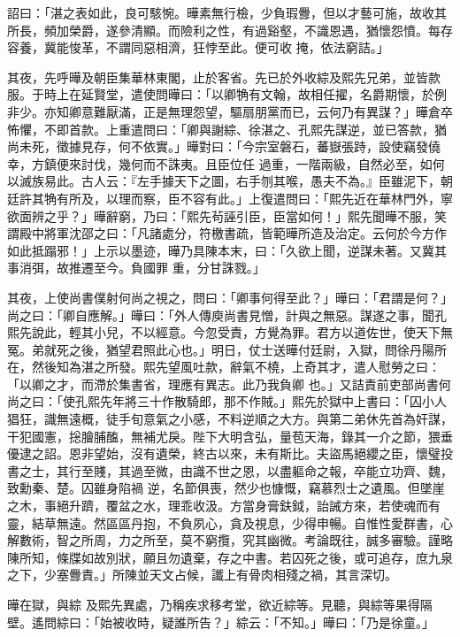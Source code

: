 \begin{pinyinscope}
 詔曰：「湛之表如此，良可駭惋。曄素無行檢，少負瑕釁，但以才藝可施，故收其所長，頻加榮爵，遂參清顯。而險利之性，有過谿壑，不識恩遇，猶懷怨憤。每存容養，冀能悛革，不謂同惡相濟，狂悖至此。便可收
 掩，依法窮詰。」



 其夜，先呼曄及朝臣集華林東閣，止於客省。先已於外收綜及熙先兄弟，並皆款服。于時上在延賢堂，遣使問曄曰：「以卿觕有文翰，故相任擢，名爵期懷，於例非少。亦知卿意難厭滿，正是無理怨望，驅扇朋黨而已，云何乃有異謀？」曄倉卒怖懼，不即首款。上重遣問曰：「卿與謝綜、徐湛之、孔熙先謀逆，並已答款，猶尚未死，徵據見存，何不依實。」曄對曰：「今宗室磐石，蕃嶽張跱，設使竊發僥幸，方鎮便來討伐，幾何而不誅夷。且臣位任
 過重，一階兩級，自然必至，如何以滅族易此。古人云：『左手據天下之圖，右手刎其喉，愚夫不為。』臣雖泥下，朝廷許其觕有所及，以理而察，臣不容有此。」上復遣問曰：「熙先近在華林門外，寧欲面辨之乎？」曄辭窮，乃曰：「熙先茍誣引臣，臣當如何！」熙先聞曄不服，笑謂殿中將軍沈邵之曰：「凡諸處分，符檄書疏，皆範曄所造及治定。云何於今方作如此抵蹋邪！」上示以墨迹，曄乃具陳本末，曰：「久欲上聞，逆謀未著。又冀其事消弭，故推遷至今。負國罪
 重，分甘誅戮。」



 其夜，上使尚書僕射何尚之視之，問曰：「卿事何得至此？」曄曰：「君謂是何？」尚之曰：「卿自應解。」曄曰：「外人傳庾尚書見憎，計與之無惡。謀遂之事，聞孔熙先說此，輕其小兒，不以經意。今忽受責，方覺為罪。君方以道佐世，使天下無冤。弟就死之後，猶望君照此心也。」明日，仗士送曄付廷尉，入獄，問徐丹陽所在，然後知為湛之所發。熙先望風吐款，辭氣不橈，上奇其才，遣人慰勞之曰：「以卿之才，而滯於集書省，理應有異志。此乃我負卿
 也。」又詰責前吏部尚書何尚之曰：「使孔熙先年將三十作散騎郎，那不作賊。」熙先於獄中上書曰：「囚小人猖狂，識無遠概，徒手旬意氣之小感，不料逆順之大方。與第二弟休先首為奸謀，干犯國憲，捴膾脯醢，無補尤戾。陛下大明含弘，量苞天海，錄其一介之節，猥垂優逮之詔。恩非望始，沒有遺榮，終古以來，未有斯比。夫盜馬絕纓之臣，懷璧投書之士，其行至賤，其過至微，由識不世之恩，以盡軀命之報，卒能立功齊、魏，致勳秦、楚。囚雖身陷禍
 逆，名節俱喪，然少也慷慨，竊慕烈士之遺風。但墜崖之木，事絕升躋，覆盆之水，理乖收汲。方當身膏鈇鉞，詒誡方來，若使魂而有靈，結草無遠。然區區丹抱，不負夙心，貪及視息，少得申暢。自惟性愛群書，心解數術，智之所周，力之所至，莫不窮攬，究其幽微。考論既往，誠多審驗。謹略陳所知，條牒如故別狀，願且勿遺棄，存之中書。若囚死之後，或可追存，庶九泉之下，少塞釁責。」所陳並天文占候，讖上有骨肉相殘之禍，其言深切。



 曄在獄，與綜
 及熙先異處，乃稱疾求移考堂，欲近綜等。見聽，與綜等果得隔壁。遙問綜曰：「始被收時，疑誰所告？」綜云：「不知。」曄曰：「乃是徐童。」




\end{pinyinscope}
